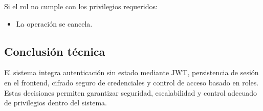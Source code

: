 \documentclass[12pt,letterpaper]{article}
\begin{document}
Si el rol no cumple con los privilegios requeridos:

\begin{itemize}
    \item La operación se cancela.
\end{itemize}

\subsection*{Conclusión técnica}

El sistema integra autenticación sin estado mediante JWT, persistencia de sesión en el frontend, cifrado seguro de credenciales y control de acceso basado en roles. Estas decisiones permiten garantizar seguridad, escalabilidad y control adecuado de privilegios dentro del sistema.
\end{document}
